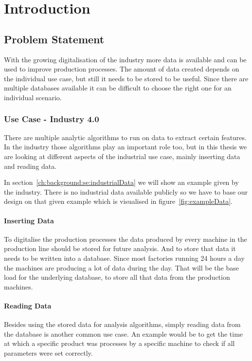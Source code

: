 \chapter{Introduction}
\label{ch:introduction}


\section{Problem Statement}
With the growing digitalisation of the industry more data is available and can be used to improve production processes.
The amount of data created depends on the individual use case,
but still it needs to be stored to be useful.
Since there are multiple databases available it can be difficult to choose the right one for an individual scenario.

\subsection{Use Case - Industry 4.0}
There are multiple analytic algorithms to run on data to extract certain features.
In the industry those algorithms play an important role too,
but in this thesis we are looking at different aspects of the industrial use case,
mainly inserting data and reading data.

In section~\ref{ch:background:se:industrialData} we will show an example given by the industry.
There is no industrial data available publicly so we have to base our design on that given example which is visualised in figure~\ref{fig:exampleData}.

\subsubsection{Inserting Data}
To digitalise the production processes the data produced by every machine in the production line should be stored for future analysis.
And to store that data it needs to be written into a database.
Since most factories running 24 hours a day the machines are producing a lot of data during the day.
That will be the base load for the underlying database, to store all that data from the production machines.

\subsubsection{Reading Data}
Besides using the stored data for analysis algorithms,
simply reading data from the database is another common use case.
An example would be to get the time at which a specific product was processes by a specific machine to check if all parameters were set correctly.

